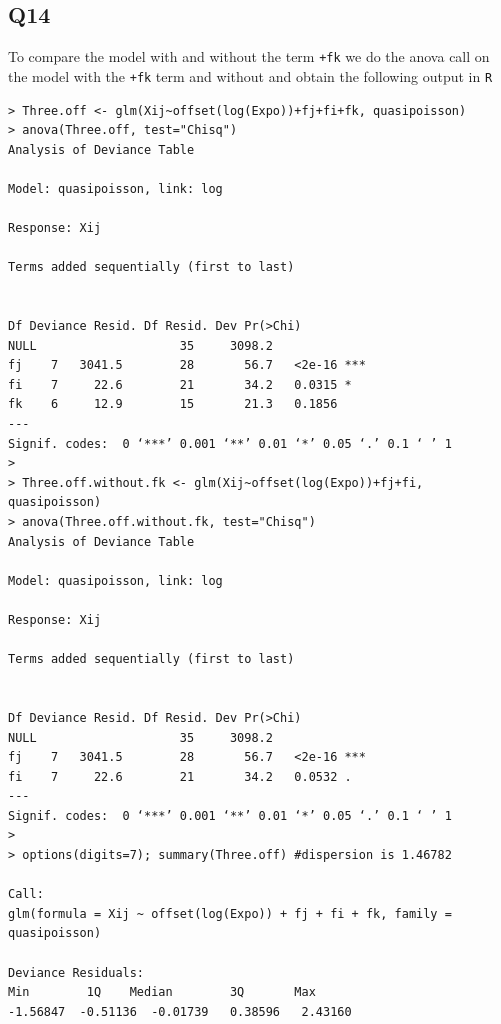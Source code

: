 \documentclass[11pt]{article}
\begin{document}
\subsection*{Q14}
To compare the model with and without the term \verb|+fk| we do the anova call on the model with the \verb|+fk| term and without and obtain the following output in \verb|R|

\begin{verbatim}
> Three.off <- glm(Xij~offset(log(Expo))+fj+fi+fk, quasipoisson)
> anova(Three.off, test="Chisq")
Analysis of Deviance Table

Model: quasipoisson, link: log

Response: Xij

Terms added sequentially (first to last)


Df Deviance Resid. Df Resid. Dev Pr(>Chi)    
NULL                    35     3098.2             
fj    7   3041.5        28       56.7   <2e-16 ***
fi    7     22.6        21       34.2   0.0315 *  
fk    6     12.9        15       21.3   0.1856    
---
Signif. codes:  0 ‘***’ 0.001 ‘**’ 0.01 ‘*’ 0.05 ‘.’ 0.1 ‘ ’ 1
> 
> Three.off.without.fk <- glm(Xij~offset(log(Expo))+fj+fi, quasipoisson)
> anova(Three.off.without.fk, test="Chisq")
Analysis of Deviance Table

Model: quasipoisson, link: log

Response: Xij

Terms added sequentially (first to last)


Df Deviance Resid. Df Resid. Dev Pr(>Chi)    
NULL                    35     3098.2             
fj    7   3041.5        28       56.7   <2e-16 ***
fi    7     22.6        21       34.2   0.0532 .  
---
Signif. codes:  0 ‘***’ 0.001 ‘**’ 0.01 ‘*’ 0.05 ‘.’ 0.1 ‘ ’ 1
> 
> options(digits=7); summary(Three.off) #dispersion is 1.46782

Call:
glm(formula = Xij ~ offset(log(Expo)) + fj + fi + fk, family = quasipoisson)

Deviance Residuals: 
Min        1Q    Median        3Q       Max  
-1.56847  -0.51136  -0.01739   0.38596   2.43160  


\end{verbatim}
\end{document}
